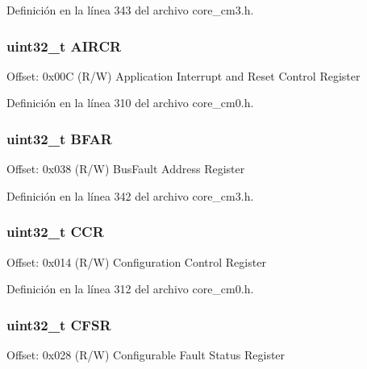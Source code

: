 Definición en la línea 343 del archivo core\+\_\+cm3.\+h.

\subsubsection[{\texorpdfstring{A\+I\+R\+CR}{AIRCR}}]{ uint32\+\_\+t A\+I\+R\+CR}\hypertarget{struct_s_c_b___type_aaec159b48828355cb770049b8b2e8d91}{}\label{struct_s_c_b___type_aaec159b48828355cb770049b8b2e8d91}
Offset\+: 0x00C (R/W) Application Interrupt and Reset Control Register 

Definición en la línea 310 del archivo core\+\_\+cm0.\+h.

\subsubsection[{\texorpdfstring{B\+F\+AR}{BFAR}}]{ uint32\+\_\+t B\+F\+AR}\hypertarget{struct_s_c_b___type_ad49f99b1c83dcab356579af171bfa475}{}\label{struct_s_c_b___type_ad49f99b1c83dcab356579af171bfa475}
Offset\+: 0x038 (R/W) Bus\+Fault Address Register 

Definición en la línea 342 del archivo core\+\_\+cm3.\+h.

\subsubsection[{\texorpdfstring{C\+CR}{CCR}}]{ uint32\+\_\+t C\+CR}\hypertarget{struct_s_c_b___type_a5e1322e27c40bf91d172f9673f205c97}{}\label{struct_s_c_b___type_a5e1322e27c40bf91d172f9673f205c97}
Offset\+: 0x014 (R/W) Configuration Control Register 

Definición en la línea 312 del archivo core\+\_\+cm0.\+h.

\subsubsection[{\texorpdfstring{C\+F\+SR}{CFSR}}]{ uint32\+\_\+t C\+F\+SR}\hypertarget{struct_s_c_b___type_ae6b1e9cde3f94195206c016214cf3936}{}\label{struct_s_c_b___type_ae6b1e9cde3f94195206c016214cf3936}
Offset\+: 0x028 (R/W) Configurable Fault Status Register 

